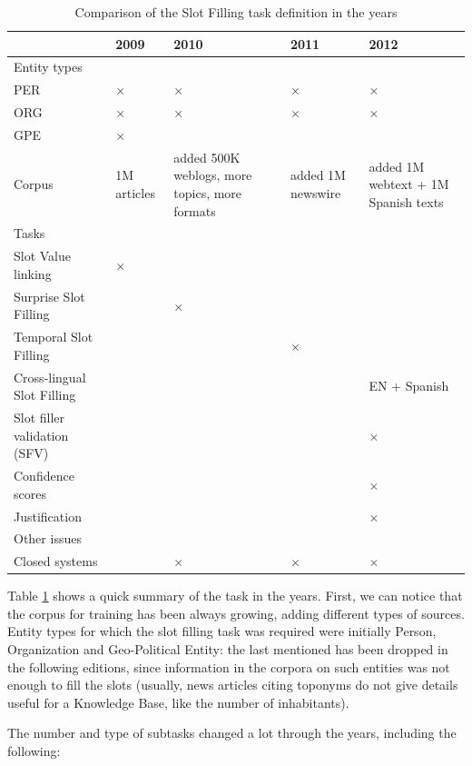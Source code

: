 \documentclass[a4paper,11pt]{report}
\newcommand{\tick}{$\times$}
\begin{document}
\begin{table}
\begin{tabularx}{\linewidth}{lXXXX}
 & 2009 & 2010 & 2011 & 2012 \\
\hline Entity types \\ 
  PER & \tick & \tick & \tick & \tick \\
  ORG & \tick & \tick & \tick & \tick \\
  GPE & \tick & & & \\
\hline Corpus & 1M articles & added 500K weblogs, more topics, more formats & added 1M newswire & added 1M webtext + 1M Spanish texts \\
\hline Tasks\\ 
 Slot Value linking & \tick & & & \\
  Surprise Slot Filling & & \tick & & \\
  Temporal Slot Filling & & & \tick & \\
  Cross-lingual Slot Filling & & & & EN + Spanish \\
  Slot filler validation (SFV) & & & & \tick \\
  Confidence scores & & & & \tick \\
  Justification & & & & \tick \\
\hline Other issues\\ 
 Closed systems & & \tick & \tick & \tick \\
 

\end{tabularx}

\caption{Comparison of the Slot Filling task definition in the years}
\label{tab:sf}
\end{table}

Table \ref{tab:sf} shows a quick summary of the task in the years. First, we can notice that the corpus for training has been always growing, adding different types of sources. Entity types for which the slot filling task was required were initially Person, Organization and Geo-Political Entity: the last mentioned has been dropped in the following editions, since information in the corpora on such entities was not enough to fill the slots (usually, news articles citing toponyms do not give details useful for a Knowledge Base, like the number of inhabitants).

The number and type of subtasks changed a lot through the years, including the following:
\end{document}
